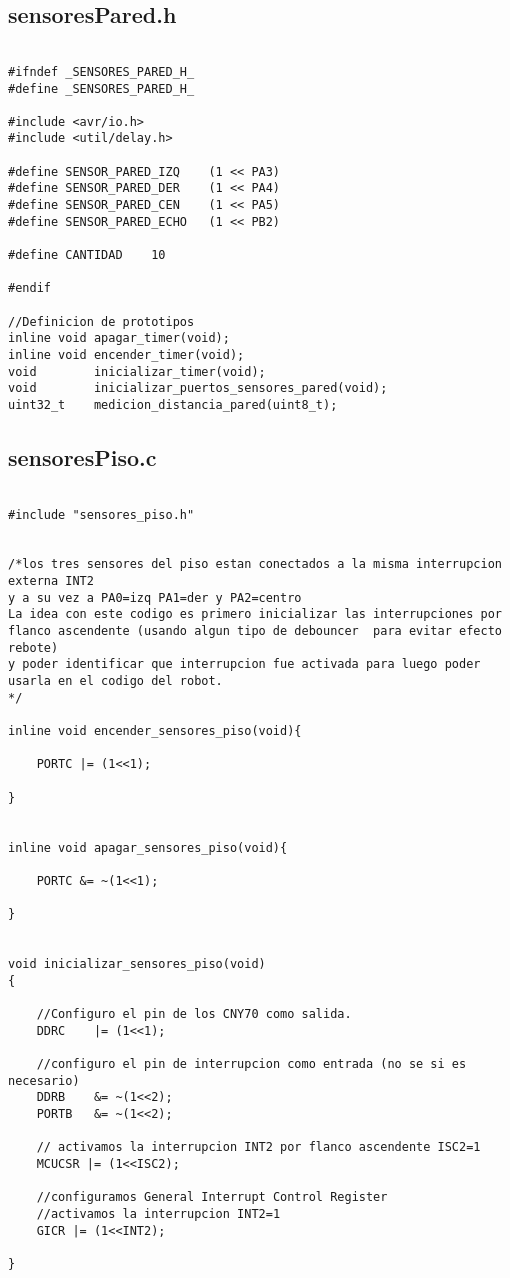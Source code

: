 \documentclass[a4paper,12pt]{article}   %
\begin{document}
\subsection{sensoresPared.h}
\begin{lstlisting}

#ifndef _SENSORES_PARED_H_
#define _SENSORES_PARED_H_

#include <avr/io.h>
#include <util/delay.h>

#define	SENSOR_PARED_IZQ	(1 << PA3)
#define	SENSOR_PARED_DER	(1 << PA4)
#define	SENSOR_PARED_CEN	(1 << PA5)
#define SENSOR_PARED_ECHO	(1 << PB2)

#define CANTIDAD    10

#endif

//Definicion de prototipos
inline void apagar_timer(void);
inline void	encender_timer(void);
void        inicializar_timer(void);
void        inicializar_puertos_sensores_pared(void);
uint32_t    medicion_distancia_pared(uint8_t);

\end{lstlisting}

\subsection{sensoresPiso.c}
\begin{lstlisting}

#include "sensores_piso.h"


/*los tres sensores del piso estan conectados a la misma interrupcion externa INT2
y a su vez a PA0=izq PA1=der y PA2=centro
La idea con este codigo es primero inicializar las interrupciones por flanco ascendente (usando algun tipo de debouncer  para evitar efecto rebote)
y poder identificar que interrupcion fue activada para luego poder usarla en el codigo del robot.
*/

inline void encender_sensores_piso(void){

    PORTC |= (1<<1);

}


inline void apagar_sensores_piso(void){

    PORTC &= ~(1<<1);

}


void inicializar_sensores_piso(void)
{

    //Configuro el pin de los CNY70 como salida.
    DDRC    |= (1<<1);

    //configuro el pin de interrupcion como entrada (no se si es necesario)
    DDRB    &= ~(1<<2);
    PORTB   &= ~(1<<2);

    // activamos la interrupcion INT2 por flanco ascendente ISC2=1
    MCUCSR |= (1<<ISC2);

    //configuramos General Interrupt Control Register
    //activamos la interrupcion INT2=1
    GICR |= (1<<INT2);

}
\end{lstlisting}
\end{document}
